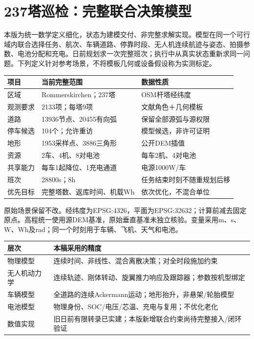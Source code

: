 \section{237塔巡检：完整联合决策模型}
\noindent 本版为统一数学定义细化，状态为建模交付、非完整求解实现。模型在同一个可行域内联合选择任务、航次、车辆道路、停靠时段、无人机连续航迹与姿态、拍摄参数、电池分配和充电。日前规划求一次完整班次；执行中从真实状态重新求同一问题。下列定义针对参考场景，不将模板几何或设备假设称为实测标定。
\begin{center}\small
\begin{tabular}{p{.26\linewidth}p{.36\linewidth}p{.28\linewidth}}\toprule
项目 & 当前完整范围 & 数据性质\\\midrule
区域 & Rommerskirchen；237塔 & OSM杆塔经纬度\\
观测要求 & 2133项；每塔9项 & 文献角色＋几何模板\\
道路 & 13936节点、20455有向弧 & 保留全部源弧与源权限\\
停车候选 & 104个；允许重访 & 模型候选，非许可证明\\
地形 & 1953采样点、3886三角形 & 公开DEM插值\\
资源 & 2车、4机、8对电池 & 每车2机、4对电池\\
共享能力 & 每车1起降位、1充电通道 & 电源1000W/车\\
班次 & 28800s；8h & 任务结束时刻不随重规划后移\\
优先目标 & 完整塔数、返库时间、机载Wh & 依次优化，不混合单位\\\bottomrule
\end{tabular}\end{center}
\noindent 原始场景保留不改。经纬度为EPSG:4326，平面为EPSG:32632；计算前减去固定原点。高程统一使用源DEM基准，原始垂直基准未独立核验。变量采用m、s、W、Wh及rad；同一个时刻用于车辆、飞机、天气和电池。
\begin{center}\small
\begin{tabular}{p{.29\linewidth}p{.61\linewidth}}\toprule
层次 & 本稿采用的精度\\\midrule
物理模型 & 连续时间、非线性、混合离散决策；对全时段施加约束\\
无人机动力学 & 连续轨迹、刚体转动、旋翼推力响应及跟踪器；参数按机型绑定\\
车辆模型 & 全道路的连续Ackermann运动；地形抬升，非悬架/轮胎模型\\
电池模型 & 物理身份、SOC/电压/芯温、充电与复用；不优化老化\\
数值实现 & 旧日前有限转录已实建；本版新增联合约束尚待完整接入/闭环验证\\\bottomrule
\end{tabular}\end{center}
\clearpage

